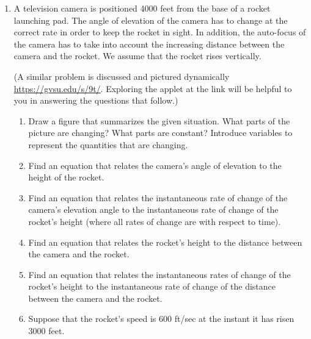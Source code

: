 \documentclass[12pt]{exam}
\begin{document}
\begin{enumerate}
\newpage




\item A television camera is positioned 4000 feet from the base of a rocket launching pad. The angle of elevation of the camera has to change at the correct rate in order to keep the rocket in sight. In addition, the auto-focus of the camera has to take into account the increasing distance between the camera and the rocket. We assume that the rocket rises vertically. 

(A similar problem is discussed and pictured dynamically \url{https://gvsu.edu/s/9t/}. Exploring the applet at the link will be helpful to you in answering the questions that follow.)

\begin{enumerate}

\item Draw a figure that summarizes the given situation. What parts of the picture are changing? What parts are constant? Introduce variables to represent the quantities that are changing.

\vfill

\item Find an equation that relates the camera’s angle of elevation to the height of the rocket.

\vfill

\item Find an equation that relates the instantaneous rate of change of the camera’s elevation angle to the instantaneous rate of change of the rocket’s height (where all rates of change are with respect to time).

\vfill

\newpage


\item Find an equation that relates the rocket’s height to the distance between the camera and the rocket.

\vfill

\item Find an equation that relates the instantaneous rates of change of the rocket’s height to the instantaneous rate of change of the distance between the camera and the rocket.

\vfill


\newpage

\item Suppose that the rocket’s speed is 600 ft/sec at the instant it has risen 3000 feet. 

\begin{enumerate}


\end{enumerate}
\end{enumerate}
\end{enumerate}
\end{document}
